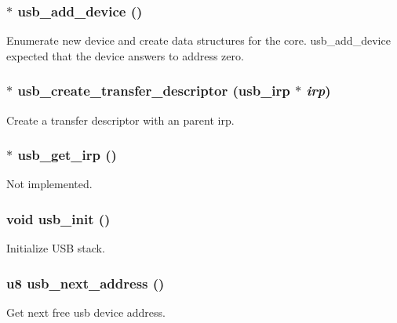 \subsubsection{$\ast$ usb\_\-add\_\-device ()}\label{core_8c_d25cbf02b3b5e22f22c697193bb87f92}


Enumerate new device and create data structures for the core. usb\_\-add\_\-device expected that the device answers to address zero. 
\subsubsection{$\ast$ usb\_\-create\_\-transfer\_\-descriptor ({\bf usb\_\-irp} $\ast$ {\em irp})}\label{core_8c_7e0bd9c92c1fb753304e6f77c0d6bd2c}


Create a transfer descriptor with an parent irp. 
\subsubsection{$\ast$ usb\_\-get\_\-irp ()}\label{core_8c_b4a317acc71220967da6cf6dd1da7ac9}


Not implemented. 
\subsubsection{\setlength{\rightskip}{0pt plus 5cm}void usb\_\-init ()}\label{core_8c_60af0d8621d025f018ba0f56bca00a93}


Initialize USB stack. 
\subsubsection{\setlength{\rightskip}{0pt plus 5cm}u8 usb\_\-next\_\-address ()}\label{core_8c_c58f28f1c2693257b89945e785403baf}


Get next free usb device address. 

